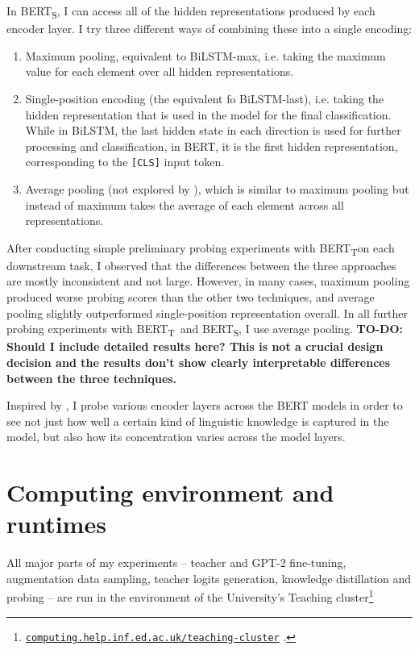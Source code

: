 \documentclass[bsc,frontabs,twoside,singlespacing,parskip,deptreport]{infthesis}
\def\BERTT{BERT\textsubscript{T}}
\def\BERTS{BERT\textsubscript{S}}
\newcommand\rurl[1]{%
  \href{https://#1}{\nolinkurl{#1}}%
}
\begin{document}
{{{      In \BERTS, I can access all of the hidden representations produced by each encoder layer. I try three different ways of combining these into a single encoding:
      \begin{enumerate}
        \item Maximum pooling, equivalent to BiLSTM-max, i.e. taking the maximum value for each element over all hidden representations.
        \item Single-position encoding (the equivalent fo BiLSTM-last), i.e. taking the hidden representation that is used in the model for the final classification. While in BiLSTM, the last hidden state in each direction is used for further processing and classification, in BERT, it is the first hidden representation, corresponding to the \verb|[CLS]| input token.
        \item Average pooling (not explored by \citeauthor{Conneau_2018}), which is similar to maximum pooling but instead of maximum takes the average of each element across all representations.
      \end{enumerate}
      After conducting simple preliminary probing experiments with \BERTT on each downstream task, I observed that the differences between the three approaches are mostly inconsistent and not large. However, in many cases, maximum pooling produced worse probing scores than the other two techniques, and average pooling slightly outperformed single-position representation overall. In all further probing experiments with \BERTT~and \BERTS, I use average pooling. \textbf{TO-DO: Should I include detailed results here? This is not a crucial design decision and the results don't show clearly interpretable differences between the three techniques.}

      Inspired by \citet{Tenney_2019b}, I probe various encoder layers across the BERT models in order to see not just how well a certain kind of linguistic knowledge is captured in the model, but also how its concentration varies across the model layers.
    }
  }

  \section{Computing environment and runtimes}{
    All major parts of my experiments -- teacher and GPT-2 fine-tuning, augmentation data sampling, teacher logits generation, knowledge distillation and probing -- are run in the environment of the University's Teaching cluster\footnote{\rurl{computing.help.inf.ed.ac.uk/teaching-cluster}.}

}}
\end{document}
